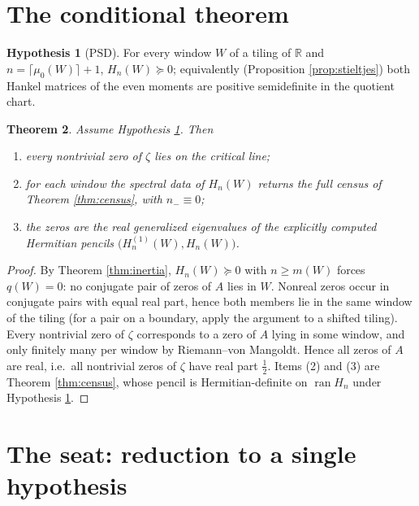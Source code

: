 \documentclass[11pt]{article}
\theoremstyle{plain}
\newtheorem{theorem}{Theorem}
\theoremstyle{definition}
\newtheorem{hypothesis}[theorem]{Hypothesis}
\theoremstyle{remark}
\newcommand{\R}{\mathbb{R}}
\DeclareMathOperator{\ran}{ran}
\begin{document}
\section{The conditional theorem}

\begin{hypothesis}[$\mathrm{PSD}$]\label{hyp:psd}
For every window $W$ of a tiling of $\R$ and $n=\lceil\mu_0(W)\rceil+1$,
$H_n(W)\succeq0$; equivalently (Proposition \ref{prop:stieltjes}) both Hankel matrices of
the even moments are positive semidefinite in the quotient chart.
\end{hypothesis}

\begin{theorem}\label{thm:main}
Assume Hypothesis \ref{hyp:psd}. Then
\begin{enumerate}
\item every nontrivial zero of $\zeta$ lies on the critical line;
\item for each window the spectral data of $H_n(W)$ returns the full census of Theorem
\ref{thm:census}, with $n_-\equiv0$;
\item the zeros are the real generalized eigenvalues of the explicitly computed
Hermitian pencils $\bigl(H^{(1)}_n(W),H_n(W)\bigr)$.
\end{enumerate}
\end{theorem}

\begin{proof}
By Theorem \ref{thm:inertia}, $H_n(W)\succeq0$ with $n\ge m(W)$ forces $q(W)=0$: no
conjugate pair of zeros of $A$ lies in $W$. Nonreal zeros occur in conjugate pairs with
equal real part, hence both members lie in the same window of the tiling (for a pair on a
boundary, apply the argument to a shifted tiling). Every nontrivial zero of $\zeta$
corresponds to a zero of $A$ lying in some window, and only finitely many per window by
Riemann--von Mangoldt. Hence all zeros of $A$ are real, i.e.\ all nontrivial zeros of
$\zeta$ have real part $\tfrac12$. Items (2) and (3) are Theorem \ref{thm:census}, whose
pencil is Hermitian-definite on $\ran H_n$ under Hypothesis \ref{hyp:psd}.
\end{proof}

\section{The seat: reduction to a single hypothesis}\label{sec:seat}
\end{document}
